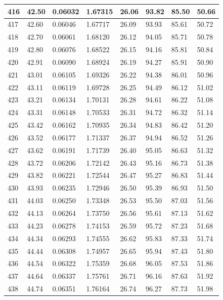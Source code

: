 \documentclass[12pt,a4paper,twoside]{article}
\begin{document}
\begin{center}
\begin{longtable}{l l l l | l l l l}
416 & 42.50 & 0.06032 & 1.67315 & 26.06 & 93.82 & 85.50 & 50.66 \\ \hline
417 & 42.60 & 0.06046 & 1.67717 & 26.09 & 93.93 & 85.61 & 50.72 \\ \hline
418 & 42.70 & 0.06061 & 1.68120 & 26.12 & 94.05 & 85.71 & 50.78 \\ \hline
419 & 42.80 & 0.06076 & 1.68522 & 26.15 & 94.16 & 85.81 & 50.84 \\ \hline
420 & 42.91 & 0.06090 & 1.68924 & 26.19 & 94.27 & 85.91 & 50.90 \\ \hline
421 & 43.01 & 0.06105 & 1.69326 & 26.22 & 94.38 & 86.01 & 50.96 \\ \hline
422 & 43.11 & 0.06119 & 1.69728 & 26.25 & 94.49 & 86.12 & 51.02 \\ \hline
423 & 43.21 & 0.06134 & 1.70131 & 26.28 & 94.61 & 86.22 & 51.08 \\ \hline
424 & 43.31 & 0.06148 & 1.70533 & 26.31 & 94.72 & 86.32 & 51.14 \\ \hline
425 & 43.42 & 0.06162 & 1.70935 & 26.34 & 94.83 & 86.42 & 51.20 \\ \hline
426 & 43.52 & 0.06177 & 1.71337 & 26.37 & 94.94 & 86.52 & 51.26 \\ \hline
427 & 43.62 & 0.06191 & 1.71739 & 26.40 & 95.05 & 86.63 & 51.32 \\ \hline
428 & 43.72 & 0.06206 & 1.72142 & 26.43 & 95.16 & 86.73 & 51.38 \\ \hline
429 & 43.82 & 0.06221 & 1.72544 & 26.47 & 95.27 & 86.83 & 51.44 \\ \hline
430 & 43.93 & 0.06235 & 1.72946 & 26.50 & 95.39 & 86.93 & 51.50 \\ \hline
431 & 44.03 & 0.06250 & 1.73348 & 26.53 & 95.50 & 87.03 & 51.56 \\ \hline
432 & 44.13 & 0.06264 & 1.73750 & 26.56 & 95.61 & 87.13 & 51.62 \\ \hline
433 & 44.23 & 0.06278 & 1.74153 & 26.59 & 95.72 & 87.23 & 51.68 \\ \hline
434 & 44.34 & 0.06293 & 1.74555 & 26.62 & 95.83 & 87.33 & 51.74 \\ \hline
435 & 44.44 & 0.06308 & 1.74957 & 26.65 & 95.94 & 87.43 & 51.80 \\ \hline
436 & 44.54 & 0.06322 & 1.75359 & 26.68 & 96.05 & 87.53 & 51.86 \\ \hline
437 & 44.64 & 0.06337 & 1.75761 & 26.71 & 96.16 & 87.63 & 51.92 \\ \hline
438 & 44.74 & 0.06351 & 1.76164 & 26.74 & 96.27 & 87.73 & 51.98 \\ \hline

\end{longtable}
\end{center}
\end{document}
